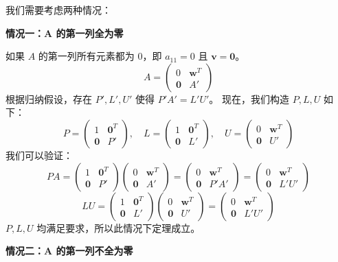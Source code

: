 \documentclass{amsart}
\theoremstyle{plain}
\theoremstyle{definition}
\theoremstyle{remark}
\begin{document}
我们需要考虑两种情况：

\textbf{情况一：A 的第一列全为零}

如果 $A$ 的第一列所有元素都为 0，即 $a_{11}=0$ 且 $\mathbf{v} = \mathbf{0}$。
\[
A = \begin{pmatrix} 0 & \mathbf{w}^T \\ \mathbf{0} & A' \end{pmatrix}
\]
根据归纳假设，存在 $P', L', U'$ 使得 $P'A' = L'U'$。
现在，我们构造 $P, L, U$ 如下：
\[
P = \begin{pmatrix} 1 & \mathbf{0}^T \\ \mathbf{0} & P' \end{pmatrix}, \quad L = \begin{pmatrix} 1 & \mathbf{0}^T \\ \mathbf{0} & L' \end{pmatrix}, \quad U = \begin{pmatrix} 0 & \mathbf{w}^T \\ \mathbf{0} & U' \end{pmatrix}
\]
我们可以验证：
\[
PA = \begin{pmatrix} 1 & \mathbf{0}^T \\ \mathbf{0} & P' \end{pmatrix} \begin{pmatrix} 0 & \mathbf{w}^T \\ \mathbf{0} & A' \end{pmatrix} = \begin{pmatrix} 0 & \mathbf{w}^T \\ \mathbf{0} & P'A' \end{pmatrix} = \begin{pmatrix} 0 & \mathbf{w}^T \\ \mathbf{0} & L'U' \end{pmatrix}
\]
\[
LU = \begin{pmatrix} 1 & \mathbf{0}^T \\ \mathbf{0} & L' \end{pmatrix} \begin{pmatrix} 0 & \mathbf{w}^T \\ \mathbf{0} & U' \end{pmatrix} = \begin{pmatrix} 0 & \mathbf{w}^T \\ \mathbf{0} & L'U' \end{pmatrix}
\]
$P, L, U$ 均满足要求，所以此情况下定理成立。

\textbf{情况二：A 的第一列不全为零}
\end{document}
